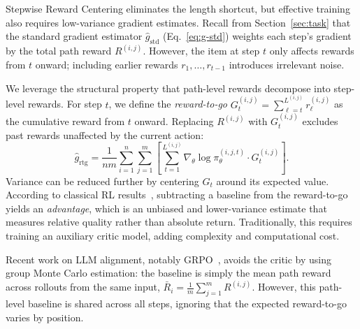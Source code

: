 \documentclass{llmxive}
\begin{document}
Stepwise Reward Centering eliminates the length shortcut, but effective training also requires low-variance gradient estimates. Recall from Section~\ref{sec:task} that the standard gradient estimator $\hat{g}_{\mathrm{std}}$ (Eq.~\eqref{eq:g-std}) weights each step's gradient by the total path reward $R^{(i,j)}$. However, the item at step $t$ only affects rewards from $t$ onward; including earlier rewards $r_1, \ldots, r_{t-1}$ introduces irrelevant noise.

We leverage the structural property that path-level rewards decompose into step-level rewards. For step $t$, we define the \emph{reward-to-go} $G_t^{(i,j)} = \sum_{\ell=t}^{L^{(i, j)}} r_\ell^{(i,j)}$ as the cumulative reward from $t$ onward. Replacing $R^{(i,j)}$ with $G_t^{(i,j)}$ excludes past rewards unaffected by the current action:
\begin{equation}
\hat{g}_{\mathrm{rtg}} = \frac{1}{nm}\sum_{i=1}^{n}\sum_{j=1}^{m}\left[\sum_{t=1}^{L^{(i,j)}} \nabla_\theta \log \pi_\theta^{(i,j,t)} \cdot G_t^{(i,j)}\right].
\label{eq:g-rtg}
\end{equation}
Variance can be reduced further by centering $G_t$ around its expected value. According to classical RL results~\cite{Williams92simple}, subtracting a baseline from the reward-to-go yields an \emph{advantage}, which is an unbiased and lower-variance estimate that measures relative quality rather than absolute return. Traditionally, this requires training an auxiliary critic model, adding complexity and computational cost.

Recent work on LLM alignment, notably GRPO~\cite{shao2024deepseekmath}, avoids the critic by using group Monte Carlo estimation: the baseline is simply the mean path reward across rollouts from the same input, $\bar{R}_i = \frac{1}{m}\sum_{j=1}^m R^{(i,j)}$. However, this path-level baseline is shared across all steps, ignoring that the expected reward-to-go varies by position.
\end{document}

